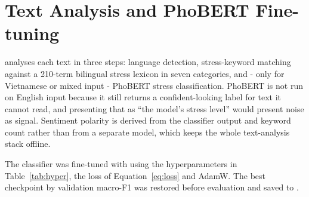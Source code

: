 
\section{Text Analysis and PhoBERT Fine-tuning}
 analyses each text in three steps: language detection, stress-keyword matching against a 210-term bilingual stress lexicon in seven categories, and - only for Vietnamese or mixed input - PhoBERT stress classification. PhoBERT is not run on English input because it still returns a confident-looking label for text it cannot read, and presenting that as ``the model's stress level'' would present noise as signal. Sentiment polarity is derived from the classifier output and keyword count rather than from a separate model, which keeps the whole text-analysis stack offline.

The classifier was fine-tuned with  using the hyperparameters in Table~\ref{tab:hyper}, the loss of Equation~\eqref{eq:loss} and AdamW. The best checkpoint by validation macro-F1 was restored before evaluation and saved to .

